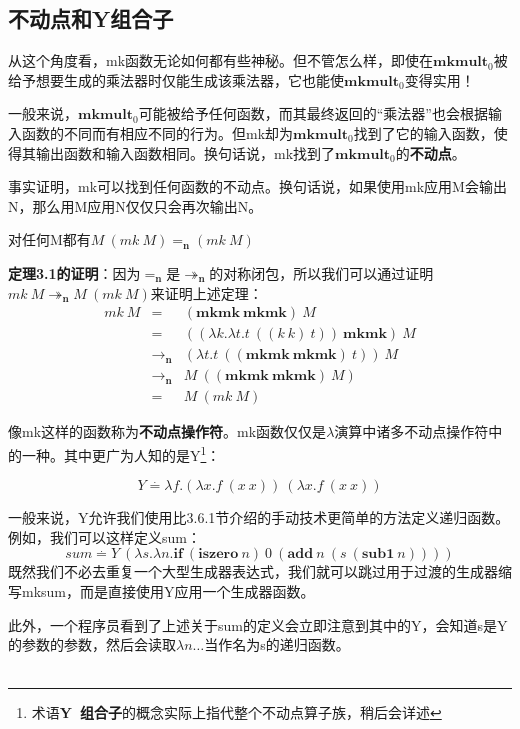 \documentclass{book}
\begin{document}
\subsection{不动点和Y组合子}
从这个角度看，mk函数无论如何都有些神秘。但不管怎么样，即使在$\mathbf{mkmult}_0$被给予想要生成的乘法器时仅能生成该乘法器，它也能使$\mathbf{mkmult}_0$变得实用！\par
一般来说，$\mathbf{mkmult}_0$可能被给予任何函数，而其最终返回的“乘法器”也会根据输入函数的不同而有相应不同的行为。但mk却为$\mathbf{mkmult}_0$找到了它的输入函数，使得其输出函数和输入函数相同。换句话说，mk找到了$\mathbf{mkmult}_0$的\textbf{不动点}。\par
事实证明，mk可以找到任何函数的不动点。换句话说，如果使用mk应用M会输出N，那么用M应用N仅仅只会再次输出N。
\begin{Theorem}
 对任何M都有$M\ (mk\ M)=_\textbf{n}(mk\ M)$
 \end{Theorem}
\begin{adjustwidth}{20pt}{20pt}
 \textbf{定理3.1的证明}：因为$=_\textbf{n}$是$\twoheadrightarrow_\textbf{n}$的对称闭包，所以我们可以通过证明$mk\ M\twoheadrightarrow_\textbf{n}M\ (mk\ M)$来证明上述定理：
 $$
 \begin{array}{lcl}
  mk\ M & = & (\mathbf{mkmk}\ \mathbf{mkmk})\ M\\
  & = & ((\lambda k.\lambda t.t\ ((k\ k)\ t))\ \mathbf{mkmk})\ M\\
 & \rightarrow_\textbf{n} & (\lambda t.t\ ((\mathbf{mkmk}\ \mathbf{mkmk})\ t))\ M\\
  & \rightarrow_\textbf{n} & M\ ((\mathbf{mkmk}\ \mathbf{mkmk})\ M)\\
  & = & M\ (mk\ M)
 \end{array}
 $$
\end{adjustwidth}
像mk这样的函数称为\textbf{不动点操作符}。mk函数仅仅是$\lambda$演算中诸多不动点操作符中的一种。其中更广为人知的是Y\footnote{术语\textbf{Y\ 组合子}的概念实际上指代整个不动点算子族，稍后会详述}：
\begin{framed}
 $$
 Y\stackrel{.}{=}\lambda f.(\lambda x.f\ (x\ x))\ (\lambda x.f\ (x\ x))
 $$
\end{framed}
一般来说，Y允许我们使用比3.6.1节介绍的手动技术更简单的方法定义递归函数。例如，我们可以这样定义sum：
$$
sum\stackrel{.}{=}Y\ (\lambda s.\lambda n.\mathbf{if}\ (\mathbf{iszero}\ n)\ 0\ (\mathbf{add}\ n\ (s\ (\mathbf{sub1}\ n))))
$$
既然我们不必去重复一个大型生成器表达式，我们就可以跳过用于过渡的生成器缩写mksum，而是直接使用Y应用一个生成器函数。\par
此外，一个程序员看到了上述关于sum的定义会立即注意到其中的Y，会知道s是Y的参数的参数，然后会读取$\lambda n\ldots$当作名为s的递归函数。\\\\
\end{document}
